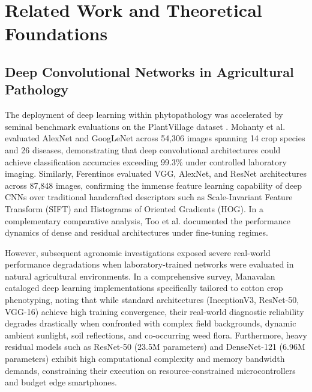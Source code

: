 \documentclass[journal,10pt,twocolumn]{IEEEtran}
\begin{document}
\section{Related Work and Theoretical Foundations}

\subsection{Deep Convolutional Networks in Agricultural Pathology}
The deployment of deep learning within phytopathology was accelerated by seminal benchmark evaluations on the PlantVillage dataset \cite{hughes2015open, mohanty2016using, ferentinos2018deep}. Mohanty et al. \cite{mohanty2016using} evaluated AlexNet and GoogLeNet across 54,306 images spanning 14 crop species and 26 diseases, demonstrating that deep convolutional architectures could achieve classification accuracies exceeding 99.3\% under controlled laboratory imaging. Similarly, Ferentinos \cite{ferentinos2018deep} evaluated VGG, AlexNet, and ResNet architectures across 87,848 images, confirming the immense feature learning capability of deep CNNs over traditional handcrafted descriptors such as Scale-Invariant Feature Transform (SIFT) and Histograms of Oriented Gradients (HOG). In a complementary comparative analysis, Too et al. \cite{too2019comparative} documented the performance dynamics of dense and residual architectures under fine-tuning regimes.

However, subsequent agronomic investigations exposed severe real-world performance degradations when laboratory-trained networks were evaluated in natural agricultural environments. In a comprehensive survey, Manavalan \cite{manavalan2022automated} cataloged deep learning implementations specifically tailored to cotton crop phenotyping, noting that while standard architectures (InceptionV3, ResNet-50, VGG-16) achieve high training convergence, their real-world diagnostic reliability degrades drastically when confronted with complex field backgrounds, dynamic ambient sunlight, soil reflections, and co-occurring weed flora. Furthermore, heavy residual models such as ResNet-50 \cite{he2016deep} (23.5M parameters) and DenseNet-121 \cite{huang2017densely} (6.96M parameters) exhibit high computational complexity and memory bandwidth demands, constraining their execution on resource-constrained microcontrollers and budget edge smartphones.
\end{document}
